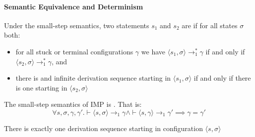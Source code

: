 \paragraph{Semantic Equivalence and Determinism}
\inlinedefinition Under the small-step semantics, two statements $s_1$ and $s_2$ are  if for all states $\sigma$ both:
\begin{itemize}
    \item for all stuck or terminal configurations $\gamma$ we have $\langle s_1, \sigma \rangle \rightarrow_1^* \gamma$ if and only if
          $\langle s_2, \sigma \rangle \rightarrow_1^* \gamma$, and
    \item there is and infinite derivation sequence starting in $\langle s_1, \sigma \rangle$ if and only if there is one starting in $\langle s_2, \sigma \rangle$
\end{itemize}

\inlinelemma The small-step semantics of IMP is . That is:
\[
    \forall s, \sigma, \gamma, \gamma'. \vdash \langle s, \sigma \rangle \rightarrow_1 \gamma
    \land \vdash \langle s, \gamma \rangle \rightarrow_1 \gamma'
    \implies \gamma = \gamma'
\]

\inlinecorollary There is exactly one derivation sequence starting in configuration $\langle s, \sigma \rangle$

